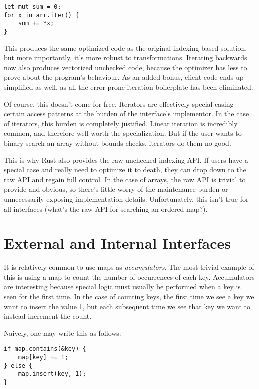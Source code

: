 \begin{verbatim}
let mut sum = 0;
for x in arr.iter() {
    sum += *x;
}
\end{verbatim}

This produces the same optimized code as the original indexing-based solution,
but more importantly, it's more robust to transformations. Iterating
backwards now also produces vectorized unchecked code, because the optimizer
has less to prove about the program's behaviour. As an added bonus, client code
ends up simplified as well, as all the error-prone iteration boilerplate has
been eliminated.

Of course, this doesn't come for free. Iterators are effectively special-casing
certain access patterns at the burden of the interface's implementor. In the
case of iterators, this burden is completely justified. Linear iteration
is incredibly common, and therefore well worth the specialization. But if the
user wants to binary search an array without bounds checks, iterators do them no
good.

This is why Rust also provides the raw unchecked indexing API. If users have a
special case and really need to optimize it to death, they can drop down to
the raw API and regain full control. In the case of arrays, the raw API is
trivial to provide and obvious, so there's little worry of the maintenance burden
or unnecessarily exposing implementation details. Unfortunately, this isn't true for all
interfaces (what's the raw API for searching an ordered map?).






\section{External and Internal Interfaces}

It is relatively common to use maps as \emph{accumulators}. The most trivial example
of this is using a map to count the number of occurrences of each key. Accumulators
are interesting because special logic must usually be performed when a key is
seen for the first time. In the case of counting keys, the first time we see a key
we want to insert the value 1, but each subsequent time we see that key
we want to instead increment the count.

Naively, one may write this as follows:

\begin{verbatim}
if map.contains(&key) {
    map[key] += 1;
} else {
    map.insert(key, 1);
}
\end{verbatim}

